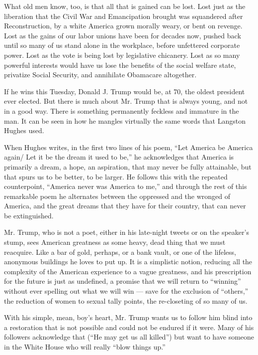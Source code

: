 What old men know, too, is that all that is gained can be lost. Lost
just as the liberation that the Civil War and Emancipation brought was
squandered after Reconstruction, by a white America grown morally weary,
or bent on revenge. Lost as the gains of our labor unions have been for
decades now, pushed back until so many of us stand alone in the
workplace, before unfettered corporate power. Lost as the vote is being
lost by legislative chicanery. Lost as so many powerful interests would
have us lose the benefits of the social welfare state, privatize Social
Security, and annihilate Obamacare altogether.

If he wins this Tuesday, Donald J. Trump would be, at 70, the oldest
president ever elected. But there is much about Mr. Trump that is always
young, and not in a good way. There is something permanently feckless
and immature in the man. It can be seen in how he mangles virtually the
same words that Langston Hughes used.

When Hughes writes, in the first two lines of his poem, ``Let America be
America again/ Let it be the dream it used to be,'' he acknowledges that
America is primarily a dream, a hope, an aspiration, that may never be
fully attainable, but that spurs us to be better, to be larger. He
follows this with the repeated counterpoint, ``America never was America
to me,'' and through the rest of this remarkable poem he alternates
between the oppressed and the wronged of America, and the great dreams
that they have for their country, that can never be extinguished.

Mr. Trump, who is not a poet, either in his late-night tweets or on the
speaker's stump, sees American greatness as some heavy, dead thing that
we must reacquire. Like a bar of gold, perhaps, or a bank vault, or one
of the lifeless, anonymous buildings he loves to put up. It is a
simplistic notion, reducing all the complexity of the American
experience to a vague greatness, and his prescription for the future is
just as undefined, a promise that we will return to ``winning'' without
ever spelling out what we will win --- save for the exclusion of
``others,'' the reduction of women to sexual tally points, the
re-closeting of so many of us.

With his simple, mean, boy's heart, Mr. Trump wants us to follow him
blind into a restoration that is not possible and could not be endured
if it were. Many of his followers acknowledge that (``He may get us all
killed'') but want to have someone in the White House who will really
``blow things up.''

